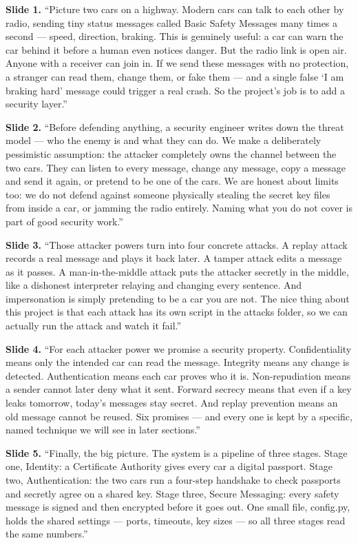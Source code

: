 \documentclass[11pt,a4paper]{report}
\begin{document}
\textbf{Slide 1.} ``Picture two cars on a highway. Modern cars can talk to each
other by radio, sending tiny status messages called Basic Safety Messages many
times a second --- speed, direction, braking. This is genuinely useful: a car
can warn the car behind it before a human even notices danger. But the radio
link is open air. Anyone with a receiver can join in. If we send these messages
with no protection, a stranger can read them, change them, or fake them --- and
a single false `I am braking hard' message could trigger a real crash. So the
project's job is to add a security layer.''

\textbf{Slide 2.} ``Before defending anything, a security engineer writes down
the threat model --- who the enemy is and what they can do. We make a deliberately
pessimistic assumption: the attacker completely owns the channel between the two
cars. They can listen to every message, change any message, copy a message and
send it again, or pretend to be one of the cars. We are honest about limits too:
we do not defend against someone physically stealing the secret key files from
inside a car, or jamming the radio entirely. Naming what you do not cover is part
of good security work.''

\textbf{Slide 3.} ``Those attacker powers turn into four concrete attacks. A
replay attack records a real message and plays it back later. A tamper attack
edits a message as it passes. A man-in-the-middle attack puts the attacker
secretly in the middle, like a dishonest interpreter relaying and changing every
sentence. And impersonation is simply pretending to be a car you are not. The
nice thing about this project is that each attack has its own script in the
attacks folder, so we can actually run the attack and watch it fail.''

\textbf{Slide 4.} ``For each attacker power we promise a security property.
Confidentiality means only the intended car can read the message. Integrity
means any change is detected. Authentication means each car proves who it is.
Non-repudiation means a sender cannot later deny what it sent. Forward secrecy
means that even if a key leaks tomorrow, today's messages stay secret. And replay
prevention means an old message cannot be reused. Six promises --- and every one
is kept by a specific, named technique we will see in later sections.''

\textbf{Slide 5.} ``Finally, the big picture. The system is a pipeline of three
stages. Stage one, Identity: a Certificate Authority gives every car a digital
passport. Stage two, Authentication: the two cars run a four-step handshake to
check passports and secretly agree on a shared key. Stage three, Secure
Messaging: every safety message is signed and then encrypted before it goes out.
One small file, config.py, holds the shared settings --- ports, timeouts, key
sizes --- so all three stages read the same numbers.''
\end{document}
